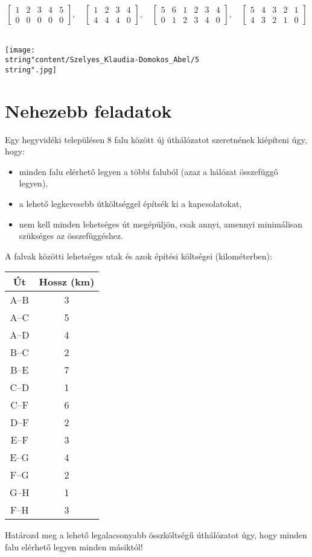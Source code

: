 \begin{solution}
	\[
	\begin{bmatrix}1 & 2 & 3 & 4 & 5\\
		0 & 0 & 0 & 0 & 0
	\end{bmatrix},\quad\begin{bmatrix}1 & 2 & 3 & 4\\
		4 & 4 & 4 & 0
	\end{bmatrix},\quad\begin{bmatrix}5 & 6 & 1 & 2 & 3 & 4\\
		0 & 1 & 2 & 3 & 4 & 0
	\end{bmatrix},\quad\begin{bmatrix}5 & 4 & 3 & 2 & 1\\
		4 & 3 & 2 & 1 & 0
	\end{bmatrix}
	\]
	\\
	\begin{center}
		\texttt{[image: \\string"content/Szelyes\_Klaudia-Domokos\_Abel/5\\string".jpg]} 
		\par\end{center}
\end{solution}

\section*{Nehezebb feladatok}
\begin{extraproblem}
	Egy hegyvidéki településen 8 falu között új úthálózatot szeretnének
	kiépíteni úgy, hogy:
	\begin{itemize}
		\item minden falu elérhető legyen a többi faluból (azaz a hálózat összefüggő
		legyen), 
		\item a lehető legkevesebb útköltséggel építsék ki a kapcsolatokat, 
		\item nem kell minden lehetséges út megépüljön, csak annyi, amennyi minimálisan
		szükséges az összefüggéshez. 
	\end{itemize}
	A falvak közötti lehetséges utak és azok építési költségei (kilométerben): 
	\begin{center}
		\begin{tabular}{|c|c|}
			\hline 
			\textbf{Út} & \textbf{Hossz (km)}\tabularnewline
			\hline 
			A--B & 3\tabularnewline
			A--C & 5\tabularnewline
			A--D & 4\tabularnewline
			B--C & 2\tabularnewline
			B--E & 7\tabularnewline
			C--D & 1\tabularnewline
			C--F & 6\tabularnewline
			D--F & 2\tabularnewline
			E--F & 3\tabularnewline
			E--G & 4\tabularnewline
			F--G & 2\tabularnewline
			G--H & 1\tabularnewline
			F--H & 3\tabularnewline
			\hline 
		\end{tabular}
		\par\end{center}
	Határozd meg a lehető legalacsonyabb összköltségű úthálózatot úgy,
	hogy minden falu elérhető legyen minden másiktól!
\end{extraproblem}

